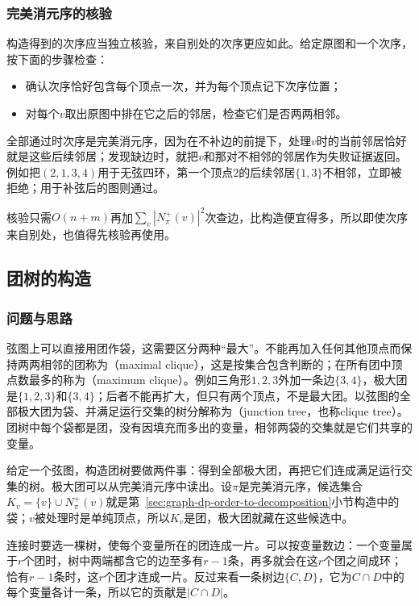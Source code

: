 \subsubsection{完美消元序的核验}

构造得到的次序应当独立核验，来自别处的次序更应如此。给定原图和一个次序，按下面的步骤检查：
\begin{itemize}
  \item 确认次序恰好包含每个顶点一次，并为每个顶点记下次序位置；
  \item 对每个$v$取出原图中排在它之后的邻居，检查它们是否两两相邻。
\end{itemize}
全部通过时次序是完美消元序，因为在不补边的前提下，处理$v$时的当前邻居恰好就是这些后续邻居；发现缺边时，就把$v$和那对不相邻的邻居作为失败证据返回。例如把$(2,1,3,4)$用于无弦四环，第一个顶点$2$的后续邻居$\{1,3\}$不相邻，立即被拒绝；用于补弦后的图则通过。

核验只需$O(n+m)$再加$\sum_v|N^+_\pi(v)|^2$次查边，比构造便宜得多，所以即使次序来自别处，也值得先核验再使用。

\subsection{团树的构造}
\label{sec:graph-dp-clique-tree}

\subsubsection{问题与思路}

弦图上可以直接用团作袋，这需要区分两种“最大”。不能再加入任何其他顶点而保持两两相邻的团称为（maximal clique），这是按集合包含判断的；在所有团中顶点数最多的称为（maximum clique）。例如三角形$1,2,3$外加一条边$\{3,4\}$，极大团是$\{1,2,3\}$和$\{3,4\}$；后者不能再扩大，但只有两个顶点，不是最大团。以弦图的全部极大团为袋、并满足运行交集的树分解称为（junction tree，也称clique tree）。团树中每个袋都是团，没有因填充而多出的变量，相邻两袋的交集就是它们共享的变量。

给定一个弦图，构造团树要做两件事：得到全部极大团，再把它们连成满足运行交集的树。极大团可以从完美消元序中读出。设$\pi$是完美消元序，候选集合$K_v=\{v\}\cup N^+_\pi(v)$就是第~\ref{sec:graph-dp-order-to-decomposition}小节构造中的袋；$v$被处理时是单纯顶点，所以$K_v$是团，极大团就藏在这些候选中。

连接时要选一棵树，使每个变量所在的团连成一片。可以按变量数边：一个变量属于$r$个团时，树中两端都含它的边至多有$r-1$条，再多就会在这$r$个团之间成环；恰有$r-1$条时，这$r$个团才连成一片。反过来看一条树边$\{C,D\}$，它为$C\cap D$中的每个变量各计一条，所以它的贡献是$|C\cap D|$。

